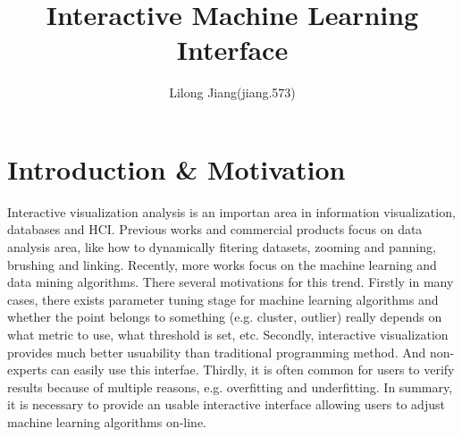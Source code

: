 \documentclass{article}
\begin{document}
	
\title{Interactive Machine Learning Interface}
\author{Lilong Jiang(jiang.573)}
\date{}
\maketitle

\section{Introduction \& Motivation}
Interactive visualization analysis is an importan area in information visualization, databases and HCI. Previous works and commercial products focus on data analysis area, like how to dynamically fitering datasets, zooming and panning, brushing and linking. Recently, more works focus on the machine learning and data mining algorithms. There several motivations for this trend. Firstly in many cases, there exists parameter tuning stage for machine learning algorithms and whether the point belongs to something (e.g. cluster, outlier) really depends on what metric to use, what threshold is set, etc. Secondly, interactive visualization provides much better usuability than traditional programming method. And non-experts can easily use this interfae. Thirdly, it is often common for users to verify results because of multiple reasons, e.g. overfitting and underfitting. In summary, it is necessary to provide an usable interactive interface allowing users to adjust machine learning algorithms on-line.
\end{document}
